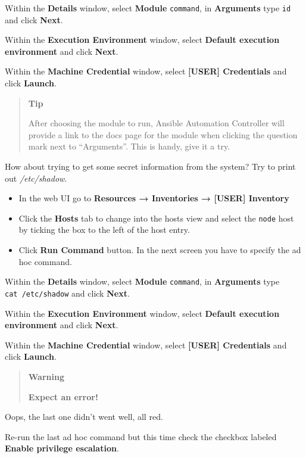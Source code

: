 Within the \textbf{Details} window, select \textbf{Module}
\texttt{command}, in \textbf{Arguments} type \texttt{id} and click
\textbf{Next}.

Within the \textbf{Execution Environment} window, select \textbf{Default
execution environment} and click \textbf{Next}.

Within the \textbf{Machine Credential} window, select \textbf{[USER]
Credentials} and click \textbf{Launch}.

\begin{quote}
\textbf{Tip}

After choosing the module to run, Ansible Automation Controller will
provide a link to the docs page for the module when clicking the
question mark next to ``Arguments''. This is handy, give it a try.
\end{quote}

How about trying to get some secret information from the system? Try to
print out \emph{/etc/shadow}.

\begin{itemize}
\item
    In the web UI go to \textbf{Resources → Inventories → [USER]
  Inventory}
\item
  Click the \textbf{Hosts} tab to change into the hosts view and select
  the \texttt{node} host by ticking the box to the left of the host entry.
\item
  Click \textbf{Run Command} button. In the next screen you have to
  specify the ad hoc command.
\end{itemize}

Within the \textbf{Details} window, select \textbf{Module}
\texttt{command}, in \textbf{Arguments} type \texttt{cat\ /etc/shadow}
and click \textbf{Next}.

Within the \textbf{Execution Environment} window, select \textbf{Default
execution environment} and click \textbf{Next}.

Within the \textbf{Machine Credential} window, select \textbf{[USER]
Credentials} and click \textbf{Launch}.

\begin{quote}
\textbf{Warning}

\textbf{Expect an error!}
\end{quote}

Oops, the last one didn't went well, all red.

Re-run the last ad hoc command but this time check the checkbox labeled
\textbf{Enable privilege escalation}.

